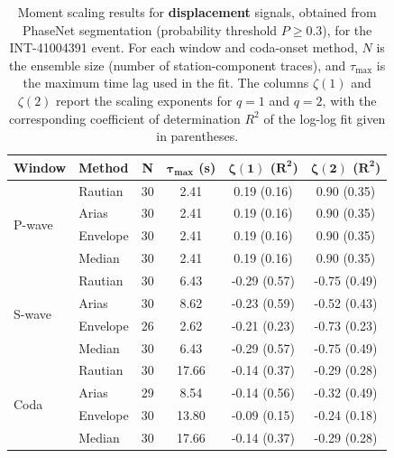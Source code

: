 \begin{table}[H]
\centering
\small
\begin{tabular}{llcccc}
\toprule
\textbf{Window} & \textbf{Method} & \textbf{N} & $\bm{\tau_{\max}}$ \textbf{(s)} & $\bm{\zeta(1)}$ \textbf{(}$\bm{R^2}$\textbf{)} & $\bm{\zeta(2)}$ \textbf{(}$\bm{R^2}$\textbf{)} \\
\midrule
\multirow{4}{*}{P-wave}
& Rautian & 30 & 2.41 & 0.19 (0.16) & 0.90 (0.35) \\
& Arias & 30 & 2.41 & 0.19 (0.16) & 0.90 (0.35) \\
& Envelope & 30 & 2.41 & 0.19 (0.16) & 0.90 (0.35) \\
& Median & 30 & 2.41 & 0.19 (0.16) & 0.90 (0.35) \\
\midrule
\multirow{4}{*}{S-wave}
& Rautian & 30 & 6.43 & -0.29 (0.57) & -0.75 (0.49) \\
& Arias & 30 & 8.62 & -0.23 (0.59) & -0.52 (0.43) \\
& Envelope & 26 & 2.62 & -0.21 (0.23) & -0.73 (0.23) \\
& Median & 30 & 6.43 & -0.29 (0.57) & -0.75 (0.49) \\
\midrule
\multirow{4}{*}{Coda}
& Rautian & 30 & 17.66 & -0.14 (0.37) & -0.29 (0.28) \\
& Arias & 29 & 8.54 & -0.14 (0.56) & -0.32 (0.49) \\
& Envelope & 30 & 13.80 & -0.09 (0.15) & -0.24 (0.18) \\
& Median & 30 & 17.66 & -0.14 (0.37) & -0.29 (0.28) \\
\bottomrule
\end{tabular}
\caption{Moment scaling results for \textbf{displacement} signals, obtained from PhaseNet segmentation (probability threshold $P \geq 0.3$), for the INT-41004391 event. For each window and coda-onset method, $N$ is the ensemble size (number of station-component traces), and $\tau_{\max}$ is the maximum time lag used in the fit. The columns $\zeta(1)$ and $\zeta(2)$ report the scaling exponents for $q=1$ and $q=2$, with the corresponding coefficient of determination $R^2$ of the log-log fit given in parentheses.}
\label{tab:phasenet_scaling_disp_thresh30_queyras}
\end{table}